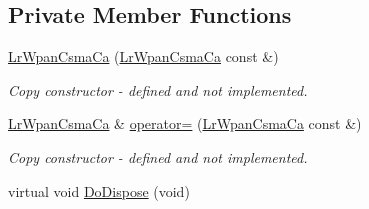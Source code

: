 \subsection*{Private Member Functions}
\begin{DoxyCompactItemize}
\item 
\hyperlink{classns3_1_1LrWpanCsmaCa_af880e414da6b38f1fda35209afb8b1f5}{Lr\+Wpan\+Csma\+Ca} (\hyperlink{classns3_1_1LrWpanCsmaCa}{Lr\+Wpan\+Csma\+Ca} const \&)
\begin{DoxyCompactList}\small\item\em Copy constructor -\/ defined and not implemented. \end{DoxyCompactList}\item 
\hyperlink{classns3_1_1LrWpanCsmaCa}{Lr\+Wpan\+Csma\+Ca} \& \hyperlink{classns3_1_1LrWpanCsmaCa_a2ef5863671692197445562df3fe0d786}{operator=} (\hyperlink{classns3_1_1LrWpanCsmaCa}{Lr\+Wpan\+Csma\+Ca} const \&)
\begin{DoxyCompactList}\small\item\em Copy constructor -\/ defined and not implemented. \end{DoxyCompactList}\item 
virtual void \hyperlink{classns3_1_1LrWpanCsmaCa_abef13463bed3244a9d5aba99a9a85c92}{Do\+Dispose} (void)
\end{DoxyCompactItemize}
